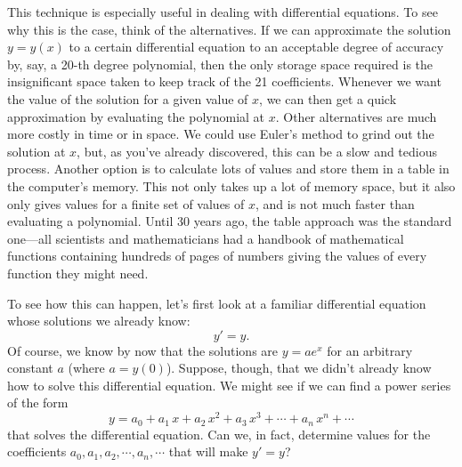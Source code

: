 This technique is especially useful in dealing with differential
equations.  To see why this is the case, think of the alternatives.
If we can approximate the solution $y=y(x)$ to a certain differential
equation to an acceptable degree of accuracy by, say, a 20-th degree
polynomial, then the only storage space required is the insignificant
space taken to keep track of the 21 coefficients.  Whenever we want
the value of the solution for a given value of $x$, we can then get a
quick approximation by evaluating the polynomial at $x$.  Other
alternatives are much more costly in time or in space.  We could use
Euler's method to grind out the solution at $x$, but, as you've
already discovered, this can be a slow and tedious process.  Another
option is to calculate lots of values and store them in a table in the
computer's memory.  This not only takes up a lot of memory space, but
it also only gives values for a finite set of values of $x$, and is
not much faster than evaluating a polynomial.  Until 30 years ago, the
table approach was the standard one---all scientists and
mathematicians had a handbook of mathematical functions containing
hundreds of pages of numbers giving the values of every function they
might need.



To see how this can happen, let's first look at a familiar
differential equation whose solutions we already know:
\[
y'=y.
\]
Of course, we know by now that the solutions are $y=ae^x$ for an
arbitrary constant $a$ (where $a=y(0)$).  Suppose, though, that we
didn't already know how to solve this differential equation.  We might
see if we can find a power series of the form
\[
y = a_0 + a_1\,x + a_2\, x^2 + a_3\, x^3 + \cdots + a_n\, x^n + \cdots
\] 
that solves the differential equation.  Can we, in fact, determine
values for the coefficients $a_0, a_1, a_2, \cdots , a_n , \cdots $
that will make $y'=y$?

